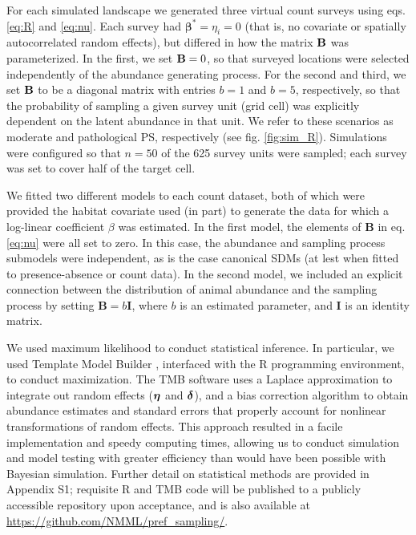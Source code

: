\documentclass[times,mee,doublespace,]{besauth2}
\begin{document}
For each simulated landscape we generated three virtual count surveys using eqs. \ref{eq:R} and \ref{eq:nu}.  Each survey had $\boldsymbol{\beta}^*=\eta_i=0$ (that is, no covariate or spatially autocorrelated random effects), but differed in how the matrix ${\bf B}$ was parameterized.  In the first, we set ${\bf B}=0$, so that surveyed locations were selected independently of the abundance generating process.  For the second and third, we set ${\bf B}$ to be a diagonal matrix with entries $b=1$ and $b=5$, respectively, so that the probability of sampling a given survey unit (grid cell) was explicitly dependent on the latent abundance in that unit.  We refer to these scenarios as moderate and pathological PS, respectively (see fig. \ref{fig:sim_R}).  Simulations were configured so that $n=50$ of the 625 survey units were sampled; each survey was set to cover half of the target cell.

We fitted two different models to each count dataset, both of which were provided the habitat covariate used (in part) to generate the data for which a log-linear coefficient $\beta$ was estimated.  In the first model, the elements of \textbf{B} in eq. \ref{eq:nu} were all set to zero.  In this case, the abundance and sampling process submodels were independent, as is the case canonical SDMs (at lest when fitted to presence-absence or count data).  In the second model, we included an explicit connection between the distribution of animal abundance and the sampling process by setting $\textbf{B}=b\textbf{I}$, where $b$ is an estimated parameter, and \textbf{I} is an identity matrix.

We used maximum likelihood to conduct statistical inference. In particular, we used Template Model Builder \citep[TMB; ][]{KristensenEtAl2016}, interfaced with the R programming environment, to conduct maximization. The TMB software uses a Laplace approximation to integrate out random effects ($\boldsymbol{\eta}$ and $\boldsymbol{\delta}$), and a bias correction algorithm \citep{TierneyEtAl1989,ThorsonKristensenInPress} to obtain abundance estimates and standard errors that properly account for nonlinear transformations of random effects.  This approach resulted in a facile implementation and speedy computing times, allowing us to conduct simulation and model testing with greater efficiency than would have been possible with Bayesian simulation.  Further detail on statistical methods are provided in Appendix S1; requisite R and TMB code will be published to a publicly accessible repository upon acceptance, and is also available at \url{https://github.com/NMML/pref_sampling/}.
\end{document}
